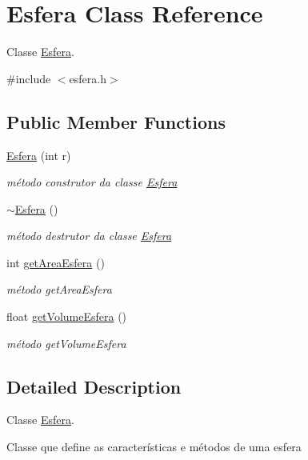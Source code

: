 \hypertarget{classEsfera}{}\section{Esfera Class Reference}
\label{classEsfera}


Classe \hyperlink{classEsfera}{Esfera}.  




{\ttfamily \#include $<$esfera.\+h$>$}

\subsection*{Public Member Functions}
\begin{DoxyCompactItemize}
\item 
\hyperlink{classEsfera_a9a44c791d890c12dc194d6ba87f32785}{Esfera} (int r)
\begin{DoxyCompactList}\small\item\em método construtor da classe \hyperlink{classEsfera}{Esfera} \end{DoxyCompactList}\item 
\hyperlink{classEsfera_abf33ddbf68a9d97d90ddb1ee83d5c994}{$\sim$\+Esfera} ()
\begin{DoxyCompactList}\small\item\em método destrutor da classe \hyperlink{classEsfera}{Esfera} \end{DoxyCompactList}\item 
int \hyperlink{classEsfera_a6845b681ad4cb2d8c6056f44d249f689}{get\+Area\+Esfera} ()
\begin{DoxyCompactList}\small\item\em método get\+Area\+Esfera \end{DoxyCompactList}\item 
float \hyperlink{classEsfera_a40c5ed416d9fce834f27c2725f6e22d0}{get\+Volume\+Esfera} ()
\begin{DoxyCompactList}\small\item\em método get\+Volume\+Esfera \end{DoxyCompactList}\end{DoxyCompactItemize}


\subsection{Detailed Description}
Classe \hyperlink{classEsfera}{Esfera}. 

Classe que define as características e métodos de uma esfera 

